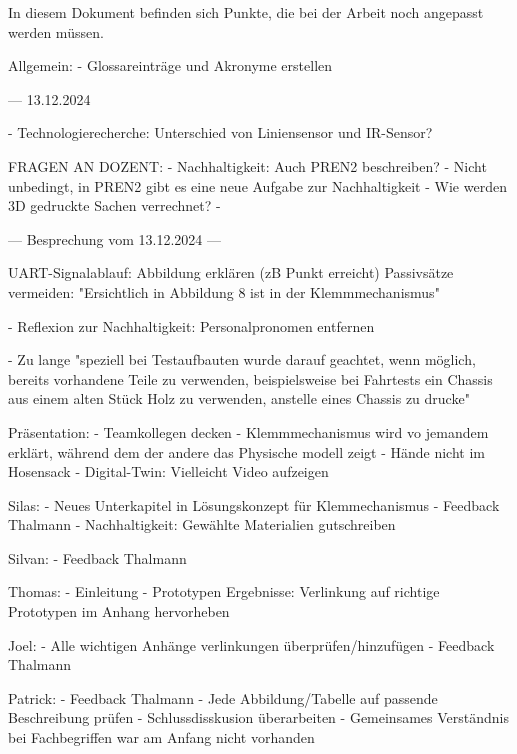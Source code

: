 
In diesem Dokument befinden sich Punkte, die bei der Arbeit noch angepasst werden müssen.

Allgemein:
- Glossareinträge und Akronyme erstellen



--- 13.12.2024

- Technologierecherche: Unterschied von Liniensensor und IR-Sensor?




FRAGEN AN DOZENT:
- Nachhaltigkeit: Auch PREN2 beschreiben?
  - Nicht unbedingt, in PREN2 gibt es eine neue Aufgabe zur Nachhaltigkeit
- Wie werden 3D gedruckte Sachen verrechnet?
  - 


--- Besprechung vom 13.12.2024 ---

UART-Signalablauf: Abbildung erklären (zB Punkt erreicht)
Passivsätze vermeiden: "Ersichtlich in Abbildung 8 ist in der Klemmmechanismus"


- Reflexion zur Nachhaltigkeit: Personalpronomen entfernen

- Zu lange "speziell bei Testaufbauten wurde darauf geachtet, wenn möglich, bereits
vorhandene Teile zu verwenden, beispielsweise bei Fahrtests ein Chassis aus einem alten Stück Holz zu verwenden, anstelle eines Chassis zu drucke"

Präsentation:
- Teamkollegen decken
- Klemmmechanismus wird vo jemandem erklärt, während dem der andere das Physische modell zeigt
- Hände nicht im Hosensack
- Digital-Twin: Vielleicht Video aufzeigen



Silas:
- Neues Unterkapitel in Lösungskonzept für Klemmechanismus
- Feedback Thalmann
- Nachhaltigkeit: Gewählte Materialien gutschreiben

Silvan:
- Feedback Thalmann

Thomas:
- Einleitung
- Prototypen Ergebnisse: Verlinkung auf richtige Prototypen im Anhang hervorheben

Joel:
- Alle wichtigen Anhänge verlinkungen überprüfen/hinzufügen
- Feedback Thalmann

Patrick:
- Feedback Thalmann
- Jede Abbildung/Tabelle auf passende Beschreibung prüfen
- Schlussdisskusion überarbeiten
  - Gemeinsames Verständnis bei Fachbegriffen war am Anfang nicht vorhanden
